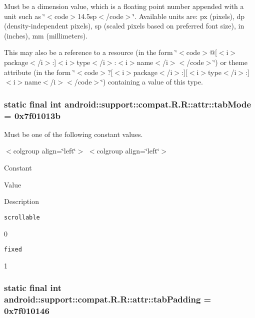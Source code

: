 Must be a dimension value, which is a floating point number appended with a unit such as \char`\"{}$<$code$>$14.5sp$<$/code$>$\char`\"{}. Available units are: px (pixels), dp (density-independent pixels), sp (scaled pixels based on preferred font size), in (inches), mm (millimeters). 

This may also be a reference to a resource (in the form \char`\"{}$<$code$>$@\mbox{[}$<$i$>$package$<$/i$>$:\mbox{]}$<$i$>$type$<$/i$>$:$<$i$>$name$<$/i$>$$<$/code$>$\char`\"{}) or theme attribute (in the form \char`\"{}$<$code$>$?\mbox{[}$<$i$>$package$<$/i$>$:\mbox{]}\mbox{[}$<$i$>$type$<$/i$>$:\mbox{]}$<$i$>$name$<$/i$>$$<$/code$>$\char`\"{}) containing a value of this type. \hypertarget{classandroid_1_1support_1_1compat_1_1_r_1_1attr_c1555a04159921ee7843bf5775d8e43d}{
\subsubsection[{tabMode}]{\setlength{\rightskip}{0pt plus 5cm}static final int android::support::compat.R.R::attr::tabMode = 0x7f01013b}}
\label{classandroid_1_1support_1_1compat_1_1_r_1_1attr_c1555a04159921ee7843bf5775d8e43d}


Must be one of the following constant values. \begin{TabularC}{0}
\hline
\end{TabularC}
$<$colgroup align=\char`\"{}left\char`\"{}$>$ $<$colgroup align=\char`\"{}left\char`\"{}$>$ 

Constant

Value

Description 

{\tt scrollable}

0

{\tt fixed}

1\hypertarget{classandroid_1_1support_1_1compat_1_1_r_1_1attr_997a0426c869fc6c10f7707a8258b65d}{
\subsubsection[{tabPadding}]{\setlength{\rightskip}{0pt plus 5cm}static final int android::support::compat.R.R::attr::tabPadding = 0x7f010146}}
\label{classandroid_1_1support_1_1compat_1_1_r_1_1attr_997a0426c869fc6c10f7707a8258b65d}


